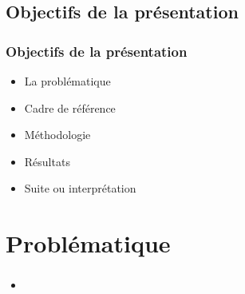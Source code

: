             \subsection{Objectifs de la présentation} 
		\begin{frame}[allowframebreaks]
			\frametitle{Objectifs de la présentation}
			\begin {itemize}
				
                                \item La problématique
                                \item Cadre de référence
                                \item Méthodologie
                                \item Résultats
                                \item Suite ou interprétation
                        \end{itemize}
		\end{frame}

               \section{Problématique} 
		\begin{frame}[allowframebreaks]
			\frametitle{}
			\begin{itemize}
				\item 
			\end{itemize}
		\end{frame}

